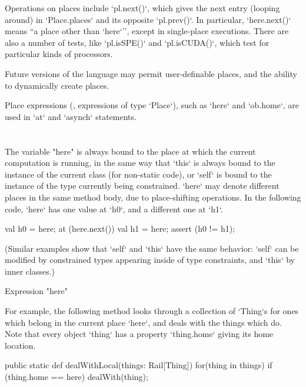 Operations on places include \xcd`pl.next()`, which gives the next entry
(looping around) in \xcd`Place.places` and its opposite \xcd`pl.prev()`. In
particular, \xcd`here.next()` means ``a place other than \xcd`here`'', except
in single-place executions.
There are also a number of tests, like \xcd`pl.isSPE()` and 
\xcd`pl.isCUDA()`, which test for particular kinds of processors.

Future versions of the language may permit user-definable
places, and the ability to dynamically create places.

Place expressions  (\viz, expressions of type
\xcd`Place`), such as \xcd`here` 
and \xcd`ob.home`, are used in \xcd`at` and
\xcd`asynch` statements.  



\section{}\label{Here}

The variable \xcd"here" is always bound to the place at which the current
computation is running, in the same way that \xcd`this` is always bound to the
instance of the current class (for non-static code), or \xcd`self` is bound to
the instance of the type currently being constrained.  
\xcd`here` may denote different places in the same method body, due to
place-shifting operations. In the following code, \xcd`here` has one value at
\xcd`h0`, and a different one at \xcd`h1`. 
\begin{xten}
val h0 = here;
at (here.next()) {
  val h1 = here; 
  assert (h0 != h1);
}
\end{xten}
\noindent
(Similar examples show that \xcd`self` and \xcd`this` have the same behavior:
\xcd`self` can be modified by constrained types appearing inside of type
constraints, and \xcd`this` by inner classes.)


\begin{grammar}
Expression \: \xcd"here" \\
\end{grammar}

\begin{example}
For example, the following method looks through a collection of \xcd`Thing`s
for ones which belong in the current place \xcd`here`, and deals with the
things which do.  Note that every object \xcd`thing` has a property
\xcd`thing.home` giving its home location.
\begin{xten}
  public static def dealWithLocal(things: Rail[Thing]) {
     for(thing in things) {
    	 if (thing.home == here) 
            dealWith(thing);
     }	  
  }
\end{xten}



\end{example}

